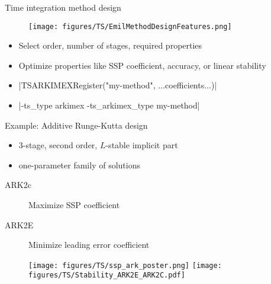 \documentclass{beamer}
\begin{document}


\begin{frame}[fragile]{Time integration method design}
  \begin{figure}
    \centering
    \texttt{[image: figures/TS/EmilMethodDesignFeatures.png]}
  \end{figure}
  \begin{itemize}
  \item Select order, number of stages, required properties
  \item Optimize properties like SSP coefficient, accuracy, or linear stability
  \item \cverb|TSARKIMEXRegister("my-method", ...coefficients...)|
  \item \cverb|-ts_type arkimex -ts_arkimex_type my-method|
  \end{itemize}
\end{frame}

\begin{frame}{Example: Additive Runge-Kutta design}
  \begin{itemize}
  \item 3-stage, second order, $L$-stable implicit part
  \item one-parameter family of solutions
  \end{itemize}
  \begin{description}
  \item[ARK2c] Maximize SSP coefficient
  \item[ARK2E] Minimize leading error coefficient
  \end{description}
  \begin{figure}
    \centering
    \texttt{[image: figures/TS/ssp\_ark\_poster.png]}
    \texttt{[image: figures/TS/Stability\_ARK2E\_ARK2C.pdf]}
  \end{figure}
\end{frame}


\end{document}
